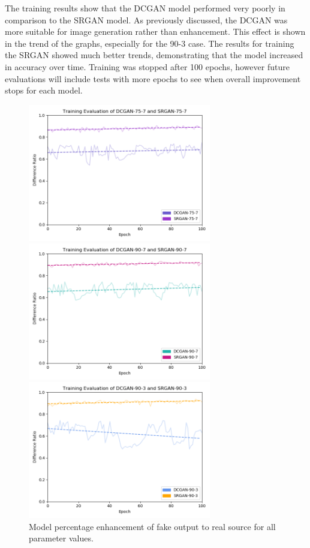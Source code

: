 \documentclass[letterpaper]{article} %
\begin{document}
The training results show that the DCGAN model performed very poorly in comparison to the SRGAN model.
As previously discussed, the DCGAN was more suitable for image generation rather than enhancement.
This effect is shown in the trend of the graphs, especially for the 90-3 case.
The results for training the SRGAN showed much better trends,
demonstrating that the model increased in accuracy over time.
Training was stopped after 100 epochs,
however future evaluations will include tests with more epochs to see when overall improvement stops
for each model.

\begin{figure}[htbp]
\centerline{\includegraphics[width=8cm]{training_75-7.png}}
\centerline{\includegraphics[width=8cm]{training_90-7.png}}
\centerline{\includegraphics[width=8cm]{training_90-3.png}}
\caption{Model percentage enhancement of fake output to real source for all parameter values.}
\label{fig:training}
\end{figure}
\end{document}
